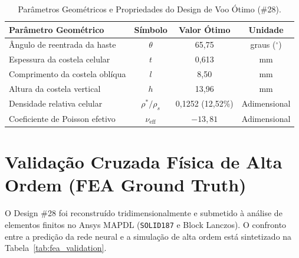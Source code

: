 \documentclass[12pt,a4paper]{report}
\begin{document}
\begin{table}[H]
\centering
\caption{Parâmetros Geométricos e Propriedades do Design de Voo Ótimo (\#28).}
\label{tab:optimal_flight_design}
\begin{tabular}{lccc}
\toprule
\textbf{Parâmetro Geométrico} & \textbf{Símbolo} & \textbf{Valor Ótimo} & \textbf{Unidade} \\
\midrule
Ângulo de reentrada da haste & $\theta$ & 65,75 & graus ($^\circ$) \\
Espessura da costela celular & $t$ & 0,613 & mm \\
Comprimento da costela oblíqua & $l$ & 8,50 & mm \\
Altura da costela vertical & $h$ & 13,96 & mm \\
Densidade relativa celular & $\rho^* / \rho_s$ & 0,1252 (12,52\%) & Adimensional \\
Coeficiente de Poisson efetivo & $\nu_{\text{eff}}$ & $-13{,}81$ & Adimensional \\
\bottomrule
\end{tabular}
\end{table}

\section{Validação Cruzada Física de Alta Ordem (FEA Ground Truth)}
O Design \#28 foi reconstruído tridimensionalmente e submetido à análise de elementos finitos no Ansys MAPDL (\texttt{SOLID187} e Block Lanczos). O confronto entre a predição da rede neural e a simulação de alta ordem está sintetizado na Tabela~\ref{tab:fea_validation}.
\end{document}
